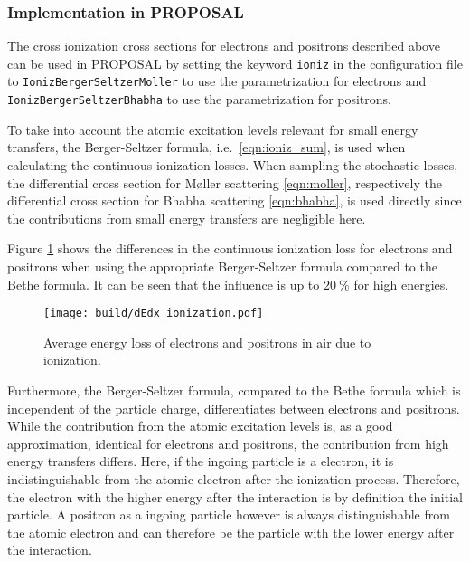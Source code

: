 \subsubsection{Implementation in PROPOSAL}


\begin{sloppypar}
The cross ionization cross sections for electrons and positrons described above can be used in PROPOSAL by setting the keyword \texttt{ioniz} in the configuration file to \texttt{IonizBergerSeltzerMoller} to use the parametrization for electrons and \texttt{IonizBergerSeltzerBhabha} to use the parametrization for positrons. 
\end{sloppypar}

To take into account the atomic excitation levels relevant for small energy transfers, the Berger-Seltzer formula, i.e.\ \eqref{eqn:ioniz_sum}, is used when calculating the continuous ionization losses.
When sampling the stochastic losses, the differential cross section for M{\o}ller scattering \eqref{eqn:moller}, respectively the differential cross section for Bhabha scattering \eqref{eqn:bhabha}, is used directly since the contributions from small energy transfers are negligible here.

Figure \ref{fig:dEdx_ionization} shows the differences in the continuous ionization loss for electrons and positrons when using the appropriate Berger-Seltzer formula compared to the Bethe formula.
It can be seen that the influence is up to $\SI{20}{\percent}$ for high energies.
%
\begin{figure}
    \centering
    \texttt{[image: build/dEdx\_ionization.pdf]}
    \caption{Average energy loss of electrons and positrons in air due to ionization.}
    \label{fig:dEdx_ionization}
\end{figure}
%
Furthermore, the Berger-Seltzer formula, compared to the Bethe formula which is independent of the particle charge, differentiates between electrons and positrons.
While the contribution from the atomic excitation levels is, as a good approximation, identical for electrons and positrons, the contribution from high energy transfers differs.
Here, if the ingoing particle is a electron, it is indistinguishable from the atomic electron after the ionization process.
Therefore, the electron with the higher energy after the interaction is by definition the initial particle.
A positron as a ingoing particle however is always distinguishable from the atomic electron and can therefore be the particle with the lower energy after the interaction.


